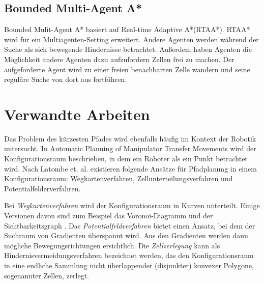 \subsection{Bounded Multi-Agent A*}
Bounded Mulit-Agent A* basiert auf Real-time Adaptive A*(RTAA*). RTAA* wird für ein Multiagenten-Setting erweitert. Andere Agenten werden während der Suche als sich bewegende Hindernisse betrachtet. Außerdem haben Agenten die Möglichkeit andere Agenten dazu aufzufordern Zellen frei zu machen. Der aufgeforderte Agent wird zu einer freien benachbarten Zelle wandern und seine reguläre Suche von dort aus fortführen\cite{Sigurdson.2019}.

\section{Verwandte Arbeiten}

\begin{sloppypar}
Das Problem des kürzesten Pfades wird ebenfalls häufig im Kontext der Robotik untersucht. In Automatic Planning of Manipulator Transfer Movements \cite{LP80} wird der Konfigurationsraum beschrieben, in dem ein Roboter als ein Punkt betrachtet wird. Nach Latombe et. al.\cite{LB91} %
existieren folgende Ansätze für Pfadplanung in einem Konfigurationsraum: Wegkartenverfahren, Zellunterteilungsverfahren und Potentialfelderverfahren.

Bei \textit{Wegkartenverfahren} wird der Konfigurationsraum in Kurven unterteilt. Einige Versionen davon sind zum Beispiel das Voronoi-Diagramm \cite{Lee82} und der Sichtbarkeitsgraph \cite{LPAW79} \cite{AOD17}. %
Das \textit{Potentialfeldverfahren} bietet einen Ansatz, bei dem der Suchraum von Gradienten überspannt wird. Aus den Gradienten werden dann mögliche Bewegungsrichtungen ersichtlich. Die \textit{Zellzerlegung} \cite{Cai09} kann als Hindernisvermeidungsverfahren bezeichnet werden, das den Konfigurationsraum in eine endliche Sammlung nicht überlappender (disjunkter) konvexer Polygone, sogenannter Zellen, zerlegt.
\end{sloppypar}
